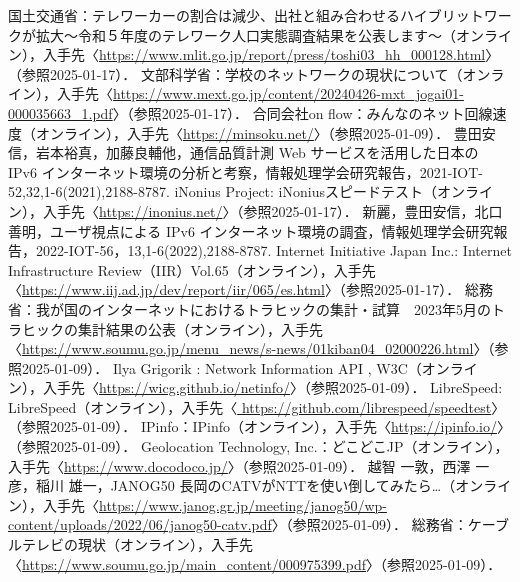 

\begin{thebibliography}{99}

     国土交通省：テレワーカーの割合は減少、出社と組み合わせるハイブリットワークが拡大～令和５年度のテレワーク人口実態調査結果を公表します～（オンライン），入手先〈\url{https://www.mlit.go.jp/report/press/toshi03_hh_000128.html}〉（参照2025-01-17）． %
     文部科学省：学校のネットワークの現状について（オンライン），入手先〈\url{https://www.mext.go.jp/content/20240426-mxt_jogai01-000035663_1.pdf}〉（参照2025-01-17）． %
     合同会社on flow：みんなのネット回線速度（オンライン），入手先〈\url{https://minsoku.net/}〉（参照2025-01-09）． %
     豊田安信，岩本裕真，加藤良輔他，通信品質計測 Web サービスを活用した日本の IPv6 インターネット環境の分析と考察，情報処理学会研究報告，2021-IOT-52,32,1-6(2021),2188-8787. %
     iNonius Project: iNoniusスピードテスト（オンライン），入手先〈\url{https://inonius.net/}〉（参照2025-01-17）． %
     新麗，豊田安信，北口善明，ユーザ視点による IPv6 インターネット環境の調査，情報処理学会研究報告，2022-IOT-56，13,1-6(2022),2188-8787. %
     Internet Initiative Japan Inc.: Internet Infrastructure Review（IIR）Vol.65（オンライン），入手先〈\url{https://www.iij.ad.jp/dev/report/iir/065/es.html}〉（参照2025-01-17）． %
     総務省：我が国のインターネットにおけるトラヒックの集計・試算　2023年5月のトラヒックの集計結果の公表（オンライン），入手先〈\url{https://www.soumu.go.jp/menu_news/s-news/01kiban04_02000226.html}〉（参照2025-01-09）． %
     Ilya Grigorik : Network Information API , W3C（オンライン），入手先〈\url{https://wicg.github.io/netinfo/}〉（参照2025-01-09）． %
     LibreSpeed: LibreSpeed（オンライン），入手先〈\url{ https://github.com/librespeed/speedtest}〉（参照2025-01-09）． %
     IPinfo：IPinfo（オンライン），入手先〈\url{https://ipinfo.io/}〉（参照2025-01-09）． %
      Geolocation Technology, Inc.：どこどこJP（オンライン），入手先〈\url{https://www.docodoco.jp/}〉（参照2025-01-09）． %
     越智 一敦，西澤 一彦，稲川 雄一，JANOG50 長岡のCATVがNTTを使い倒してみたら…（オンライン），入手先〈\url{https://www.janog.gr.jp/meeting/janog50/wp-content/uploads/2022/06/janog50-catv.pdf}〉（参照2025-01-09）． %
     総務省：ケーブルテレビの現状（オンライン），入手先〈\url{https://www.soumu.go.jp/main_content/000975399.pdf}〉（参照2025-01-09）． %

\end{thebibliography}
